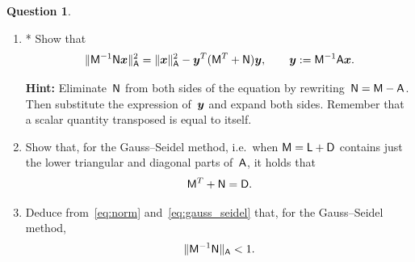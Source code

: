 \documentclass[10pt]{article}
\theoremstyle{definition}
\newtheorem{question}{Question}
\theoremstyle{remark}
\theoremstyle{plain}%
\begin{document}
\begin{question}
\begin{enumerate}
        \item
            *
            Show that
            \begin{equation}
                \label{eq:norm}
                \lVert\mathsf M^{-1} \mathsf N \mathbf{\boldsymbol{x}}\rVert_{\mathsf A}^2
                = \lVert\mathbf{\boldsymbol{x}}\rVert_{\mathsf A}^2 - \mathbf{\boldsymbol{y}}^T (\mathsf M^T + \mathsf N) \mathbf{\boldsymbol{y}},
                \qquad \mathbf{\boldsymbol{y}} :=  \mathsf M^{-1} \mathsf A \mathbf{\boldsymbol{x}}.
            \end{equation}

            \textbf{Hint: } Eliminate~$\mathsf N$ from both sides of the equation by rewriting~$\mathsf N = \mathsf M - \mathsf A$.
            Then substitute the expression of~$\mathbf{\boldsymbol{y}}$ and expand both sides.
            Remember that a scalar quantity transposed is equal to itself.

        \item
            \mymark
            Show that, for the Gauss--Seidel method,
            i.e.\ when $\mathsf M = \mathsf L + \mathsf D$ contains just the lower triangular and diagonal parts of~$\mathsf A$,
            it holds that
            \begin{equation}
                \label{eq:gauss_seidel}
                \mathsf M^T + \mathsf N = \mathsf D.
            \end{equation}

        \item
            Deduce from~\eqref{eq:norm} and~\eqref{eq:gauss_seidel} that,
            for the Gauss--Seidel method,
            \[
                \lVert\mathsf M^{-1} \mathsf N\rVert_{\mathsf A} < 1.
            \]
    \end{enumerate}
\end{question}
\end{document}
